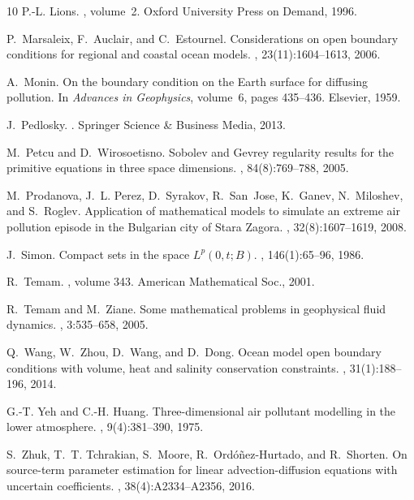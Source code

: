 \documentclass[11pt, a4paper]{article}
\begin{document}
\begin{thebibliography}{10}
P.-L. Lions.
, volume~2.
\newblock Oxford University Press on Demand, 1996.

P.~Marsaleix, F.~Auclair, and C.~Estournel.
\newblock Considerations on open boundary conditions for regional and coastal ocean models.
, 23(11):1604--1613, 2006.

A.~Monin.
\newblock On the boundary condition on the Earth surface for diffusing pollution.
\newblock In {\em Advances in Geophysics}, volume~6, pages 435--436. Elsevier, 1959.



J.~Pedlosky.
.
\newblock Springer Science \& Business Media, 2013.

M.~Petcu and D.~Wirosoetisno.
\newblock Sobolev and Gevrey regularity results for the primitive equations in three space dimensions.
, 84(8):769--788, 2005.

M.~Prodanova, J.~L. Perez, D.~Syrakov, R.~San~Jose, K.~Ganev, N.~Miloshev, and S.~Roglev.
\newblock Application of mathematical models to simulate an extreme air pollution episode in the Bulgarian city of Stara Zagora.
, 32(8):1607--1619, 2008.

J.~Simon.
\newblock Compact sets in the space $L^p(0, t; B)$.
, 146(1):65--96, 1986.

R.~Temam.
, volume 343.
\newblock American Mathematical Soc., 2001.

R.~Temam and M.~Ziane.
\newblock Some mathematical problems in geophysical fluid dynamics.
, 3:535--658, 2005.

Q.~Wang, W.~Zhou, D.~Wang, and D.~Dong.
\newblock Ocean model open boundary conditions with volume, heat and salinity conservation constraints.
, 31(1):188--196, 2014.

G.-T. Yeh and C.-H. Huang.
\newblock Three-dimensional air pollutant modelling in the lower atmosphere.
, 9(4):381--390, 1975.

S.~Zhuk, T.~T. Tchrakian, S.~Moore, R.~Ord{\'o}{\~n}ez-Hurtado, and R.~Shorten.
\newblock On source-term parameter estimation for linear advection-diffusion equations with uncertain coefficients.
, 38(4):A2334--A2356, 2016.

\end{thebibliography}
\end{document}
